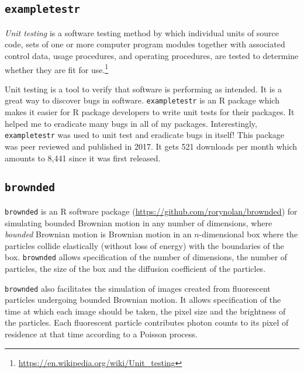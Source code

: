 \documentclass[12pt,]{book}
\let\rmarkdownfootnote\footnote%
\def\footnote{\protect\rmarkdownfootnote}
\theoremstyle{definition}
\theoremstyle{definition}
\theoremstyle{definition}
\theoremstyle{remark}
\let\BeginKnitrBlock\begin \let\EndKnitrBlock\end
\begin{document}
\subsection{\texorpdfstring{\texttt{exampletestr}}{exampletestr}}\label{exampletestr}

\BeginKnitrBlock{definition}
\protect\hypertarget{def:unnamed-chunk-28}{}{\label{def:unnamed-chunk-28}
}\emph{Unit testing} is a software testing method by which individual
units of source code, sets of one or more computer program modules
together with associated control data, usage procedures, and operating
procedures, are tested to determine whether they are fit for
use.\footnote{\url{https://en.wikipedia.org/wiki/Unit_testing}}
\EndKnitrBlock{definition}

Unit testing is a tool to verify that software is performing as
intended. It is a great way to discover bugs in software.
\texttt{exampletestr} is an R package which makes it easier for R
package developers to write unit tests for their packages. It helped me
to eradicate many bugs in all of my packages. Interestingly,
\texttt{exampletestr} was used to unit test and eradicate bugs in
itself! This package was peer reviewed and published in
2017.\citep{exampletestr} It gets 521 downloads per month which amounts
to 8,441 since it was first released.

\subsection{\texorpdfstring{\texttt{brownded}}{brownded}}\label{brownded}

\texttt{brownded} is an R software package
(\url{https://github.com/rorynolan/brownded}) for simulating bounded
Brownian motion in any number of dimensions, where \emph{bounded}
Brownian motion is Brownian motion in an \(n\)-dimensional box where the
particles collide elastically (without loss of energy) with the
boundaries of the box. \texttt{brownded} allows specification of the
number of dimensions, the number of particles, the size of the box and
the diffusion coefficient of the particles.

\texttt{brownded} also facilitates the simulation of images created from
fluorescent particles undergoing bounded Brownian motion. It allows
specification of the time at which each image should be taken, the pixel
size and the brightness of the particles. Each fluorescent particle
contributes photon counts to its pixel of residence at that time
according to a Poisson process.
\end{document}
